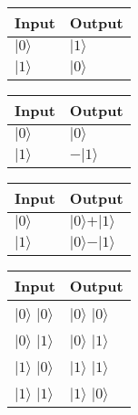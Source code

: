 \documentclass[DIV=12, english, fontsize=12pt, parskip=half]{scrartcl}
\begin{document}
		
	\centering 
	
	\begin{tabular}{|l|l|}
		\hline
		Input & Output \\ \hline
		$\vert 0 \rangle$ & $\vert 1 \rangle$ \\ \hline
		$\vert 1 \rangle$ & $\vert 0 \rangle$ \\ \hline
	\end{tabular}


	\begin{tabular}{|l|l|}
		\hline
		Input & Output \\ \hline
		$\vert 0 \rangle$ & $\vert 0 \rangle$ \\ \hline
		$\vert 1 \rangle$ & $-\vert 1 \rangle$ \\ \hline
	\end{tabular}
 
 
	\begin{tabular}{|l|l|}
		\hline
		Input & Output \\ \hline
		$\vert 0 \rangle$ & $\vert 0 \rangle + \vert 1 \rangle$ \\ \hline
		$\vert 1 \rangle$ & $\vert 0 \rangle - \vert 1 \rangle$ \\ \hline
	\end{tabular}


	\begin{tabular}{|l|l|}
		\hline
		Input & Output \\ \hline
		$\vert 0 \rangle$ $\vert 0 \rangle$ & $\vert 0 \rangle$ $\vert 0 \rangle$ \\ \hline
		$\vert 0 \rangle$ $\vert 1 \rangle$ & $\vert 0 \rangle$ $\vert 1 \rangle$ \\ \hline
		$\vert 1 \rangle$ $\vert 0 \rangle$ & $\vert 1 \rangle$ $\vert 1 \rangle$ \\ \hline
		$\vert 1 \rangle$ $\vert 1 \rangle$ & $\vert 1 \rangle$ $\vert 0 \rangle$ \\ \hline
	\end{tabular}

	
	
\end{document}

